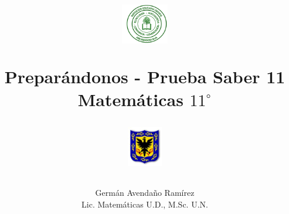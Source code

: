 \documentclass[10pt,addpoints]{exam}
\begin{document}
\title{\begin{minipage}{.2\textwidth}
        \includegraphics[height=1.75cm]{Images/logo-colegio.png}
       \end{minipage}
\begin{minipage}{.55\textwidth}
 \begin{center}
Prepar\'andonos - Prueba Saber 11 \\Matem\'aticas $11^{\circ}$
\end{center}
\end{minipage}
\begin{minipage}{.2\textwidth}
\includegraphics[height=1.75cm]{Images/logo-sed.png} 
\end{minipage}
}
\author{Germ\'{a}n Avendaño Ram\'{i}rez\\Lic. Matemáticas U.D., M.Sc. U.N.}
\date{}
\maketitle
\begin{center}
\end{center}
\vspace{0.1in}
\end{document}
